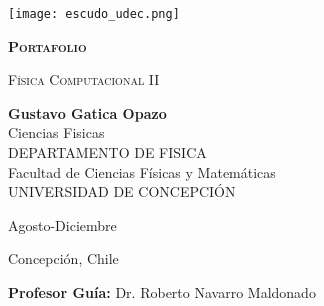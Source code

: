 \documentclass[../portafolio.tex]{subfiles}
\begin{document}


\begin{titlepage}
  
  
  \thispagestyle{frontpage}
  
  \begin{center}
    
    \texttt{[image: escudo\_udec.png]}
    
    
    \vspace*{3\baselineskip}

      \textsc{\Huge \textbf{Portafolio}}
      \vspace*{1.5\baselineskip}
      
      \textsc{\huge Física Computacional II}\\ %
      
      \vspace*{4\baselineskip}
      
      \large{\textbf{Gustavo Gatica Opazo}}\\ 
      
      \large{Ciencias Fisicas \\
        DEPARTAMENTO DE FISICA \\
        Facultad de Ciencias Físicas y Matemáticas\\
        UNIVERSIDAD DE CONCEPCIÓN}
      
    
    \vspace{4\baselineskip}

    Agosto-Diciembre \the\year

    \vspace{0.1\baselineskip}

    Concepción, Chile 

    \vspace{1.5\baselineskip}
    
    \large{\textbf{Profesor Guía:} Dr. Roberto Navarro Maldonado}\\
    
  \end{center}
  
  \vspace*{4\baselineskip}
  
  
\end{titlepage}
\end{document}
